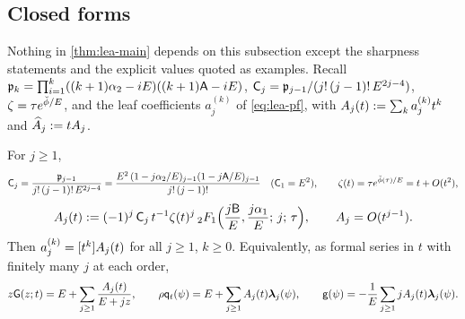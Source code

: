 
\subsection{Closed forms}
\label{sec:lea-closed}

Nothing in \cref{thm:lea-main} depends on this subsection except the sharpness statements and the explicit values quoted as examples. Recall $\mathfrak{p}_k = \prod_{i=1}^{k}((k+1)\alpha_2 - iE)((k+1)\mathsf{A} - iE)$, $\mathsf{C}_j = \mathfrak{p}_{j-1}/(j!\,(j-1)!\,E^{2j-4})$, $\zeta = \tau e^{\breve{\phi}/E}$, and the leaf coefficients $a_j^{(k)}$ of \eqref{eq:lea-pf}, with $A_j(t) := \sum_ka_j^{(k)}t^k$ and $\widehat{A}_j := tA_j$.

\begin{thm}
\label{thm:lea-Aj}
For $j\geq 1$,
\[
\mathsf{C}_j = \frac{\mathfrak{p}_{j-1}}{j!\,(j-1)!\,E^{2j-4}} = \frac{E^2\,(1-j\alpha_2/E)_{j-1}(1-j\mathsf{A}/E)_{j-1}}{j!\,(j-1)!}\quad(\mathsf{C}_1 = E^2),\qquad \zeta(t) = \tau e^{\breve{\phi}(\tau)/E} = t + O(t^2),
\]
\begin{equation}
\label{eq:lea-Aj}
A_j(t) := (-1)^j\,\mathsf{C}_j\,t^{-1}\zeta(t)^j\,{}_2F_1\Bigl(\frac{j\mathsf{B}}{E},\frac{j\alpha_1}{E};\,j;\,\tau\Bigr),\qquad A_j = O(t^{j-1}).
\end{equation}
Then $a_j^{(k)} = [t^k]A_j(t)$ for all $j\geq 1$, $k\geq 0$. Equivalently, as formal series in $t$ with finitely many $j$ at each order,
\[
z\mathsf{G}(z;t) = E + \sum_{j\geq 1}\frac{A_j(t)}{E+jz},\qquad \rho\mathsf{q}_{t}(\psi) = E + \sum_{j\geq 1}A_j(t)\boldsymbol{\lambda}_j(\psi),\qquad \mathsf{g}(\psi) = -\frac1E\sum_{j\geq 1}jA_j(t)\boldsymbol{\lambda}_j(\psi).
\]
\end{thm}

